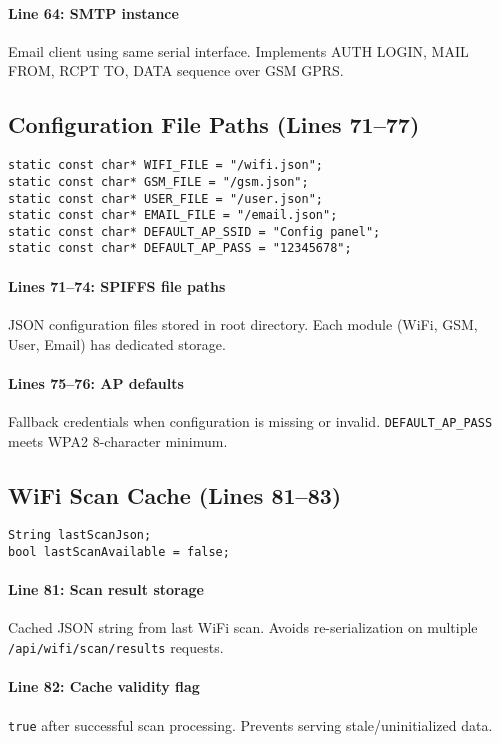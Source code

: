 \documentclass[11pt,a4paper]{article}
\begin{document}
\paragraph{Line 64: SMTP instance}
Email client using same serial interface. Implements AUTH LOGIN, MAIL FROM, RCPT TO, DATA sequence over GSM GPRS.

\subsection{Configuration File Paths (Lines 71--77)}

\begin{verbatim}
static const char* WIFI_FILE = "/wifi.json";
static const char* GSM_FILE = "/gsm.json";
static const char* USER_FILE = "/user.json";
static const char* EMAIL_FILE = "/email.json";
static const char* DEFAULT_AP_SSID = "Config panel";
static const char* DEFAULT_AP_PASS = "12345678";
\end{verbatim}

\paragraph{Lines 71--74: SPIFFS file paths}
JSON configuration files stored in root directory. Each module (WiFi, GSM, User, Email) has dedicated storage.

\paragraph{Lines 75--76: AP defaults}
Fallback credentials when configuration is missing or invalid. \texttt{DEFAULT\_AP\_PASS} meets WPA2 8-character minimum.

\subsection{WiFi Scan Cache (Lines 81--83)}

\begin{verbatim}
String lastScanJson;
bool lastScanAvailable = false;
\end{verbatim}

\paragraph{Line 81: Scan result storage}
Cached JSON string from last WiFi scan. Avoids re-serialization on multiple \texttt{/api/wifi/scan/results} requests.

\paragraph{Line 82: Cache validity flag}
\texttt{true} after successful scan processing. Prevents serving stale/uninitialized data.
\end{document}
